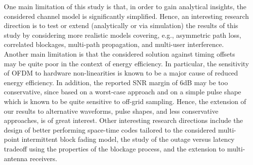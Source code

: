 \documentclass[10pt,journal,a4paper]{IEEEtran}
\begin{document}
One main limitation of this study is that, in order to gain analytical insights, the considered channel model is significantly simplified. Hence, an interesting research direction is to test or extend (analytically or via simulation) the results of this study by considering more realistic models covering, e.g., asymmetric path loss, correlated blockages, multi-path propagation, and multi-user interference. Another main limitation is that the considered solution against timing offsets may be quite poor in the context of energy efficiency. In particular, the sensitivity of OFDM to hardware non-linearities is known to be a major cause of reduced energy efficiency. In addition, the reported SNR margin of 6dB may be too conservative, since based on a worst-case approach and on a simple pulse shape which is known to be quite sensitive to off-grid sampling. Hence, the extension of our results to alternative waveforms, pulse shapes, and less conservative approaches, is of great interest. Other interesting research directions include the design of better performing space-time codes tailored to the considered multi-point intermittent block fading model, the study of the outage versus latency tradeoff using the properties of the blockage process, and the extension to multi-antenna receivers.
\end{document}
